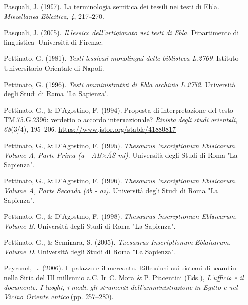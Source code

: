 \documentclass[
]{book}
\newlength{\cslhangindent}
\newlength{\cslentryspacingunit} %
\newenvironment{CSLReferences}[2] %
 {%
  \setlength{\parindent}{0pt}
  \ifodd #1
  \let\oldpar\par
  \def\par{\hangindent=\cslhangindent\oldpar}
  \fi
  \setlength{\parskip}{#2\cslentryspacingunit}
 }%
 {}
\begin{document}
\begin{CSLReferences}{1}{0}
\leavevmode{}%
Pasquali, J. (1997). La terminologia semitica dei tessili nei testi di Ebla. \emph{Miscellanea Eblaitica}, \emph{4}, 217--270.

\leavevmode{}%
Pasquali, J. (2005). \emph{Il lessico dell'artigianato nei testi di Ebla}. Dipartimento di linguistica, Università di Firenze.

\leavevmode{}%
Pettinato, G. (1981). \emph{Testi lessicali monolingui della biblioteca L.2769}. Istituto Universitario Orientale di Napoli.

\leavevmode{}%
Pettinato, G. (1996). \emph{Testi amministrativi di Ebla archivio L.2752}. Università degli Studi di Roma "La Sapienza".

\leavevmode{}%
Pettinato, G., \& D'Agostino, F. (1994). Proposta di interpretazione del testo TM.75.G.2396: verdetto o accordo internazionale? \emph{Rivista degli studi orientali}, \emph{68}(3/4), 195--206. \url{https://www.jstor.org/stable/41880817}

\leavevmode{}%
Pettinato, G., \& D'Agostino, F. (1995). \emph{Thesaurus Inscriptionum Eblaicarum. Volume A, Parte Prima (a - AB×ÁŠ-mí)}. Università degli Studi di Roma "La Sapienza".

\leavevmode{}%
Pettinato, G., \& D'Agostino, F. (1996). \emph{Thesaurus Inscriptionum Eblaicarum. Volume A, Parte Seconda (áb - az)}. Università degli Studi di Roma "La Sapienza".

\leavevmode{}%
Pettinato, G., \& D'Agostino, F. (1998). \emph{Thesaurus Inscriptionum Eblaicarum. Volume B}. Università degli Studi di Roma "La Sapienza".

\leavevmode{}%
Pettinato, G., \& Seminara, S. (2005). \emph{Thesaurus Inscriptionum Eblaicarum. Volume D}. Università degli Studi di Roma "La Sapienza".

\leavevmode{}%
Peyronel, L. (2006). Il palazzo e il mercante. Riflessioni sui sistemi di scambio nella Siria del III millennio a.C. In C. Mora \& P. Piacentini (Eds.), \emph{L'ufficio e il documento. I luoghi, i modi, gli strumenti dell'amministrazione in Egitto e nel Vicino Oriente antico} (pp. 257--280).


\end{CSLReferences}
\end{document}
